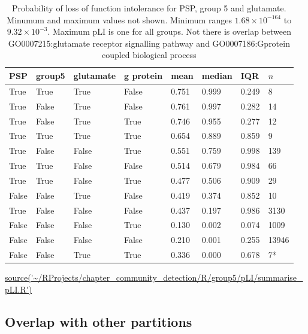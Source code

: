 \begin{table}[ht]
\centering
\setlength{\extrarowheight}{2pt}
\begin{tabular}{llllllll}
  \toprule
PSP & group5 & glutamate & g protein & mean & median & IQR & $n$ \\ 
  \midrule
True   & True   & True   & False & 0.751 & 0.999 & 0.249 & 8 \\ 
  True   & False & True   & False & 0.761 & 0.997 & 0.282 & 14 \\ 
  True   & False & True   & True   & 0.746 & 0.955 & 0.277 & 12 \\ 
  True   & True   & True   & True   & 0.654 & 0.889 & 0.859 & 9 \\ 
  True   & False & False & True   & 0.551 & 0.759 & 0.998 & 139 \\ 
  True   & True   & False & False & 0.514 & 0.679 & 0.984 & 66 \\ 
  True   & True   & False & True   & 0.477 & 0.506 & 0.909 & 29 \\ 
  False & False & True   & False & 0.419 & 0.374 & 0.852 & 10 \\ 
  True   & False & False & False & 0.437 & 0.197 & 0.986 & 3130 \\ 
  False & False & False & True   & 0.130 & 0.002 & 0.074 & 1009 \\ 
  False & False & False & False & 0.210 & 0.001 & 0.255 & 13946 \\ 
  False & False & True   & True & 0.336 & 0.000 & 0.678 & 7* \\ 
   \bottomrule
\end{tabular}
\caption{Probability of loss of function intolerance for PSP, group 5 and glutamate. Minumum and maximum values not shown. Minimum ranges $1.68 \times 10^{-164}$ to $9.32\times 10^{-3}$. Maximum pLI is one for all groups. Not there is overlap between GO0007215:glutamate receptor signalling pathway and GO0007186:Gprotein coupled biological process} 
\tiny\url{source('~/RProjects/chapter_community_detection/R/group5/pLI/summarise_pLI.R')}
\label{tab:Probability of loss of function intolerance for PSP, group 5 and glutamate}
\end{table}


\subsection{Overlap with other partitions}

